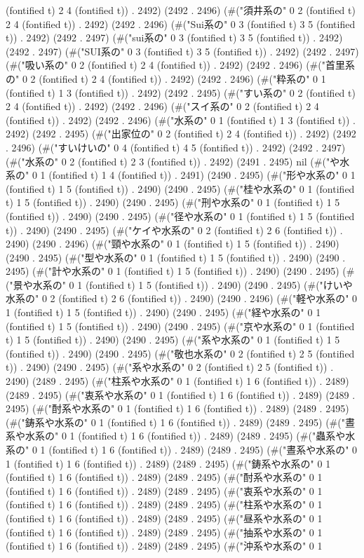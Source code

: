 {(fontified t) 2 4 (fontified t)) . 2492) (2492 . 2496) (#("須井系の" 0 2 (fontified t) 2 4 (fontified t)) . 2492) (2492 . 2496) (#("Sui系の" 0 3 (fontified t) 3 5 (fontified t)) . 2492) (2492 . 2497) (#("sui系の" 0 3 (fontified t) 3 5 (fontified t)) . 2492) (2492 . 2497) (#("SUI系の" 0 3 (fontified t) 3 5 (fontified t)) . 2492) (2492 . 2497) (#("吸い系の" 0 2 (fontified t) 2 4 (fontified t)) . 2492) (2492 . 2496) (#("首里系の" 0 2 (fontified t) 2 4 (fontified t)) . 2492) (2492 . 2496) (#("粋系の" 0 1 (fontified t) 1 3 (fontified t)) . 2492) (2492 . 2495) (#("すい系の" 0 2 (fontified t) 2 4 (fontified t)) . 2492) (2492 . 2496) (#("スイ系の" 0 2 (fontified t) 2 4 (fontified t)) . 2492) (2492 . 2496) (#("水系の" 0 1 (fontified t) 1 3 (fontified t)) . 2492) (2492 . 2495) (#("出家位の" 0 2 (fontified t) 2 4 (fontified t)) . 2492) (2492 . 2496) (#("すいけいの" 0 4 (fontified t) 4 5 (fontified t)) . 2492) (2492 . 2497) (#("水系の" 0 2 (fontified t) 2 3 (fontified t)) . 2492) (2491 . 2495) nil (#("や水系の" 0 1 (fontified t) 1 4 (fontified t)) . 2491) (2490 . 2495) (#("形や水系の" 0 1 (fontified t) 1 5 (fontified t)) . 2490) (2490 . 2495) (#("桂や水系の" 0 1 (fontified t) 1 5 (fontified t)) . 2490) (2490 . 2495) (#("刑や水系の" 0 1 (fontified t) 1 5 (fontified t)) . 2490) (2490 . 2495) (#("径や水系の" 0 1 (fontified t) 1 5 (fontified t)) . 2490) (2490 . 2495) (#("ケイや水系の" 0 2 (fontified t) 2 6 (fontified t)) . 2490) (2490 . 2496) (#("頸や水系の" 0 1 (fontified t) 1 5 (fontified t)) . 2490) (2490 . 2495) (#("型や水系の" 0 1 (fontified t) 1 5 (fontified t)) . 2490) (2490 . 2495) (#("計や水系の" 0 1 (fontified t) 1 5 (fontified t)) . 2490) (2490 . 2495) (#("景や水系の" 0 1 (fontified t) 1 5 (fontified t)) . 2490) (2490 . 2495) (#("けいや水系の" 0 2 (fontified t) 2 6 (fontified t)) . 2490) (2490 . 2496) (#("軽や水系の" 0 1 (fontified t) 1 5 (fontified t)) . 2490) (2490 . 2495) (#("経や水系の" 0 1 (fontified t) 1 5 (fontified t)) . 2490) (2490 . 2495) (#("京や水系の" 0 1 (fontified t) 1 5 (fontified t)) . 2490) (2490 . 2495) (#("系や水系の" 0 1 (fontified t) 1 5 (fontified t)) . 2490) (2490 . 2495) (#("敬也水系の" 0 2 (fontified t) 2 5 (fontified t)) . 2490) (2490 . 2495) (#("系や水系の" 0 2 (fontified t) 2 5 (fontified t)) . 2490) (2489 . 2495) (#("柱系や水系の" 0 1 (fontified t) 1 6 (fontified t)) . 2489) (2489 . 2495) (#("衷系や水系の" 0 1 (fontified t) 1 6 (fontified t)) . 2489) (2489 . 2495) (#("酎系や水系の" 0 1 (fontified t) 1 6 (fontified t)) . 2489) (2489 . 2495) (#("鋳系や水系の" 0 1 (fontified t) 1 6 (fontified t)) . 2489) (2489 . 2495) (#("晝系や水系の" 0 1 (fontified t) 1 6 (fontified t)) . 2489) (2489 . 2495) (#("蟲系や水系の" 0 1 (fontified t) 1 6 (fontified t)) . 2489) (2489 . 2495) (#("晝系や水系の" 0 1 (fontified t) 1 6 (fontified t)) . 2489) (2489 . 2495) (#("鋳系や水系の" 0 1 (fontified t) 1 6 (fontified t)) . 2489) (2489 . 2495) (#("酎系や水系の" 0 1 (fontified t) 1 6 (fontified t)) . 2489) (2489 . 2495) (#("衷系や水系の" 0 1 (fontified t) 1 6 (fontified t)) . 2489) (2489 . 2495) (#("柱系や水系の" 0 1 (fontified t) 1 6 (fontified t)) . 2489) (2489 . 2495) (#("昼系や水系の" 0 1 (fontified t) 1 6 (fontified t)) . 2489) (2489 . 2495) (#("抽系や水系の" 0 1 (fontified t) 1 6 (fontified t)) . 2489) (2489 . 2495) (#("沖系や水系の" 0 1 }
